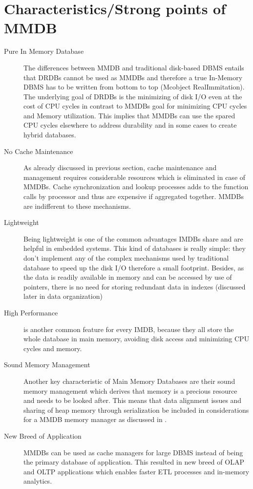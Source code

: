 \documentclass[10pt]{article} %
\begin{document}
\section{Characteristics/Strong points of MMDB}
\begin{description}

\item[Pure In Memory Database]The differences between MMDB and traditional disk-based DBMS entails that DRDBs cannot be used as MMDBs and therefore a true In-Memory DBMS has to be written from bottom to top (Mcobject RealImmitation). The underlying goal of DRDBs is the minimizing of disk I/O even at the cost of CPU cycles in contrast to MMDBs goal for minimizing CPU cycles and Memory utilization. This implies that MMDBs can use the spared CPU cycles elsewhere to address durability and in some cases to create hybrid databases. 

\item[No Cache Maintenance] As already discussed in previous section, cache maintenance and management requires considerable resources which is eliminated in case of MMDBs. Cache synchronization and lookup processes adds to the function calls by processor and thus are expensive if aggregated together. MMDBs are indifferent to these mechanisms.

\item[Lightweight] Being lightweight is one of the common advantages IMDBs share and are helpful in embedded systems. This kind of databases is really simple: they don't implement any of the complex mechanisms used by traditional database to speed up the disk I/O therefore a small footprint.
Besides, as the data is readily available in memory and can be accessed by use of pointers, there is no need for storing redundant data in indexes (discussed later in data organization)

\item[High Performance] is another common feature for every IMDB, because they all store the whole database in main memory, avoiding disk access and minimizing CPU cycles and memory.

\item[Sound Memory Management ]Another key characteristic of Main Memory Databases are their sound memory management which derives that memory is a precious resource and needs to be looked after. This means that data alignment issues and sharing of heap memory through serialization be included in considerations for a MMDB memory manager as discussed in \cite{Mcobject-RealvsImmi}.

\item[New Breed of Application] MMDBs can be used as cache managers for large DBMS instead of being the primary database of application. This resulted in new breed of OLAP and OLTP applications which enables faster ETL processes and in-memory analytics.

\end{description}
\end{document}
